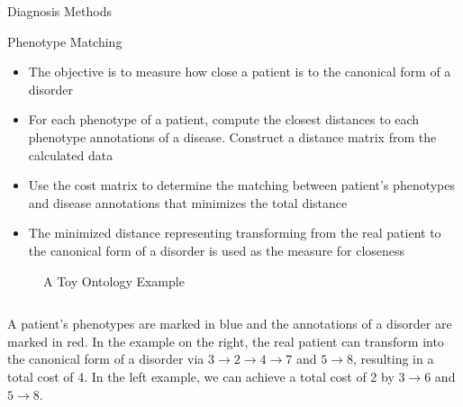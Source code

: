 \documentclass[final]{beamer} %
\begin{document}
\begin{frame}{}
\begin{columns}[T]
\begin{column}{0.3\linewidth}
{\begin{block}{\Huge Diagnosis Methods}
     \begin{block}{\Large Phenotype Matching}
       \begin{itemize}
         \Large
       \item The objective is to measure how close a patient is to the
         canonical form of a disorder \vspace{1cm}
       \item For each phenotype of a patient, compute the closest
         distances to each phenotype annotations of a
         disease. Construct a distance matrix from the calculated data
         \vspace{1cm}
       \item Use the cost matrix to determine the matching between
         patient's phenotypes and disease annotations that minimizes
         the total distance \vspace{1cm}
       \item The minimized distance representing transforming from the
         real patient to the canonical form of a disorder is used as
         the measure for closeness
       \end{itemize}
       \vspace{0.5cm}
       \begin{figure}
         \centering
         \caption{A Toy Ontology Example}
       \end{figure}
       \begin{columns}[T]
         \begin{column}{.9\textwidth}
           \large A patient's phenotypes are marked in blue and the
           annotations of a disorder are marked in red. In the example
           on the right, the real patient can transform into the
           canonical form of a disorder via $3 \rightarrow 2
           \rightarrow 4 \rightarrow 7$ and $5 \rightarrow 8$,
           resulting in a total cost of 4. In the left example, we can
           achieve a total cost of 2 by $3 \rightarrow 6$ and $5
           \rightarrow 8$.
         \end{column}
       \end{columns}
   

\end{block}
\end{block}}
\end{column}
\end{columns}
\end{frame}
\end{document}
